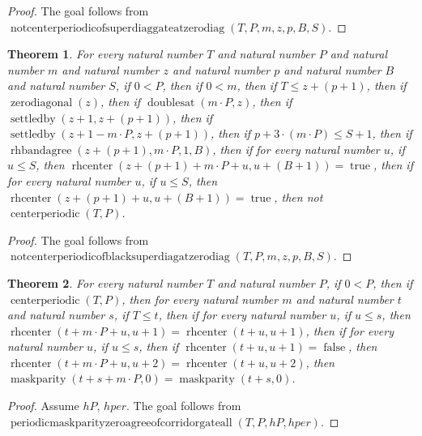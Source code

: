 \documentclass[11pt]{article}
\newtheorem{theorem}{Theorem}[section]
\theoremstyle{definition}
\begin{document}
\begin{proof}
The goal follows from \(\operatorname{notcenterperiodicofsuperdiaggateatzerodiag}(T, P, m, z, p, B, S)\).
\end{proof}
\begin{theorem}
\label{ll:paper:not-centerperiodic-of-black-superdiag-at-zero-diag}
For every natural number \(T\) and natural number \(P\) and natural number \(m\) and natural number \(z\) and natural number \(p\) and natural number \(B\) and natural number \(S\), if \(0 < P\), then if \(0 < m\), then if \(T \le z + (p + 1)\), then if \(\operatorname{zerodiagonal}(z)\), then if \(\operatorname{doublesat}(m \cdot P, z)\), then if \(\operatorname{settledby}(z + 1, z + (p + 1))\), then if \(\operatorname{settledby}(z + 1 - m \cdot P, z + (p + 1))\), then if \(p + 3 \cdot (m \cdot P) \le S + 1\), then if \(\operatorname{rhbandagree}(z + (p + 1), m \cdot P, 1, B)\), then if for every natural number \(u\), if \(u \le S\), then \(\operatorname{rhcenter}(z + (p + 1) + m \cdot P + u, u + (B + 1)) = \operatorname{true}\), then if for every natural number \(u\), if \(u \le S\), then \(\operatorname{rhcenter}(z + (p + 1) + u, u + (B + 1)) = \operatorname{true}\), then not \(\operatorname{centerperiodic}(T, P)\).
\end{theorem}
\begin{proof}
The goal follows from \(\operatorname{notcenterperiodicofblacksuperdiagatzerodiag}(T, P, m, z, p, B, S)\).
\end{proof}
\begin{theorem}
\label{ll:paper:periodic-maskparity-zero-agree-of-corridor-gate-all}
For every natural number \(T\) and natural number \(P\), if \(0 < P\), then if \(\operatorname{centerperiodic}(T, P)\), then for every natural number \(m\) and natural number \(t\) and natural number \(s\), if \(T \le t\), then if for every natural number \(u\), if \(u \le s\), then \(\operatorname{rhcenter}(t + m \cdot P + u, u + 1) = \operatorname{rhcenter}(t + u, u + 1)\), then if for every natural number \(u\), if \(u \le s\), then if \(\operatorname{rhcenter}(t + u, u + 1) = \operatorname{false}\), then \(\operatorname{rhcenter}(t + m \cdot P + u, u + 2) = \operatorname{rhcenter}(t + u, u + 2)\), then \(\operatorname{maskparity}(t + s + m \cdot P, 0) = \operatorname{maskparity}(t + s, 0)\).
\end{theorem}
\begin{proof}
Assume \(hP\), \(hper\).
The goal follows from \(\operatorname{periodicmaskparityzeroagreeofcorridorgateall}(T, P, hP, hper)\).
\end{proof}
\end{document}

